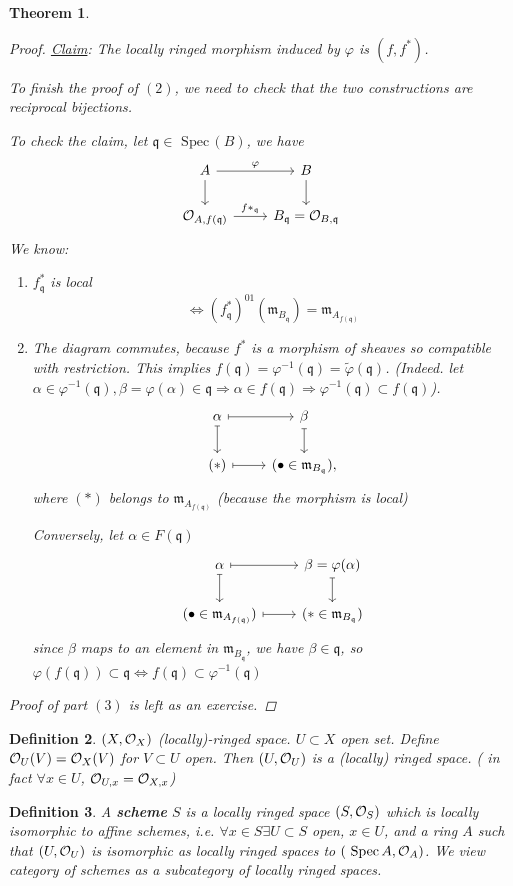 \documentclass[11pt]{article}
\newtheorem{thm}{Theorem}[section]
\newtheorem{dfn}[thm]{Definition}
\newcommand{\spec}{\text{ Spec}\,}
\newcommand{\scm}{{\mathfrak m}}
\newcommand{\scq}{\mathfrak q}
\newcommand{\calo}{{\cal O}}
\newcommand{\Lrta}{\Longrightarrow}
\newcommand{\Llrta}{\Longleftrightarrow}
\begin{document}
\begin{thm}
\begin{proof}
\underline{Claim}: The locally ringed morphism induced by $\varphi$ is $(f,f^*)$.

To finish the proof of $(2)$, we need to check that the two constructions are reciprocal bijections.

To check the claim, let $\scq\in \spec(B)$, we have
$$
\begin{tikzcd}
A \arrow[r, "\varphi"] \arrow[d] & B \arrow[d] \\
\calo_{A,f(\scq)} \arrow[r, "f*_\scq"] & B_\scq=\calo_{B,\scq}
\end{tikzcd}
$$
We know:
\begin{enumerate}[label=(\arabic*)]
\item $f^*_\scq$ is local 
$$
\Llrta (f^*_\scq)^{01}(\scm_{B_\scq})=\scm_{A_{f(\scq)}}
$$
\item The diagram commutes, because $f^*$ is a morphism of sheaves so compatible with restriction. This implies $f(\scq)=\varphi^{-1}(\scq)=\tilde{\varphi}(\scq)$. (Indeed. let $\alpha\in\varphi^{-1}(\scq),\beta=\varphi(\alpha)\in\scq\Lrta \alpha\in f(\scq)\Lrta \varphi^{-1}(\scq)\subset f(\scq)$).
$$
\begin{tikzcd}
\alpha \arrow[d, maps to] \arrow[r, maps to] & \beta \arrow[d, maps to] \\
(*) \arrow[r, maps to] & (\bullet\in \scm_{B_\scq}),
\end{tikzcd}
$$
where $(*)$ belongs to $\scm_{A_{f(\scq)}}$ (because the morphism is local)

Conversely, let $\alpha\in F(\scq)$
$$
\begin{tikzcd}
\alpha \arrow[d, maps to] \arrow[r, maps to] & \beta=\varphi(\alpha) \arrow[d, maps to] \\
(\bullet\in \scm_{A_{f(\scq)}}) \arrow[r, maps to] & (*\in \scm_{B_\scq})
\end{tikzcd}
$$
since $\beta$ maps to an element in $\scm_{B_\scq}$, we have $\beta\in\scq$, so $\varphi(f(\scq))\subset \scq\Llrta f(\scq)\subset \varphi^{-1}(\scq)$
\end{enumerate}

Proof of part $(3)$ is left as an exercise.
\end{proof}
\end{thm}
\begin{dfn}
$(X,\calo_X)$ (locally)-ringed space. $U\subset X$ open set.  Define $\calo_U(V)=\calo_X(V)$ for $V\subset U$ open.  Then $(U,\calo_U)$ is a (locally) ringed space. ( in fact $\forall x\in U$, $\calo_{U,x}=\calo_{X,x}$)
\end{dfn}
\begin{dfn}
A \textbf{scheme} $S$ is a locally ringed space $(S,\calo_S)$  which is locally isomorphic to affine schemes, i.e.
 $\forall x\in S\exists U\subset S$  open, $x\in U$, and a ring $A$ such that $(U,\calo_U)$ is isomorphic as locally ringed spaces to $(\spec A,\calo_A)$. We view category of schemes as a subcategory of locally ringed spaces.
\end{dfn}
\end{document}
